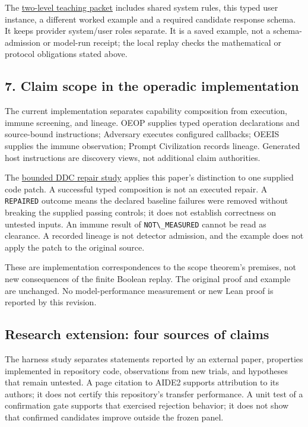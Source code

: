 \documentclass[
  11pt,
]{article}
\newcommand{\passthrough}[1]{#1}
\begin{document}
The \href{prompts/example.yaml}{two-level teaching packet} includes
shared system rules, this typed user instance, a different worked
example and a required candidate response schema. It keeps provider
system/user roles separate. It is a saved example, not a
schema-admission or model-run receipt; the local replay checks the
mathematical or protocol obligations stated above.

\subsection{7. Claim scope in the operadic
implementation}\label{claim-scope-in-the-operadic-implementation}

The current implementation separates capability composition from
execution, immune screening, and lineage. OEOP supplies typed operation
declarations and source-bound instructions; Adversary executes configured
callbacks; OEEIS supplies the immune observation; Prompt Civilization
records lineage. Generated host instructions are discovery views, not
additional claim authorities.

The \href{../028/paper.pdf}{bounded DDC repair study} applies this
paper's distinction to one supplied code patch. A successful typed
composition is not an executed repair. A
\passthrough{\lstinline!REPAIRED!} outcome means the declared baseline
failures were removed without breaking the supplied passing controls; it
does not establish correctness on untested inputs. An immune result of
\passthrough{\lstinline!NOT\_MEASURED!} cannot be read as clearance. A
recorded lineage is not detector admission, and the example does not
apply the patch to the original source.

These are implementation correspondences to the scope theorem's
premises, not new consequences of the finite Boolean replay. The
original proof and example are unchanged. No model-performance
measurement or new Lean proof is reported by this revision.

\subsection{Research extension: four sources of
claims}\label{research-extension-four-sources-of-claims}

The harness study separates statements reported by an external paper,
properties implemented in repository code, observations from new trials,
and hypotheses that remain untested. A page citation to AIDE2 supports
attribution to its authors; it does not certify this repository's
transfer performance. A unit test of a confirmation gate supports that
exercised rejection behavior; it does not show that confirmed candidates
improve outside the frozen panel.
\end{document}
